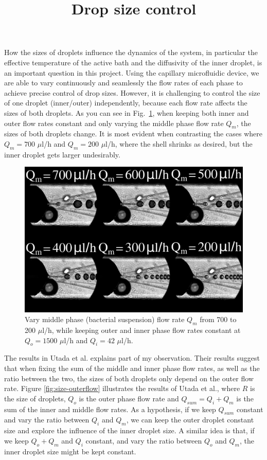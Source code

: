 \documentclass[onecolumn,aps, pre,amsmath,amssymb,longbibliography,12pt]{revtex4-2}
\begin{document}
\title{Drop size control}
\maketitle

How the sizes of droplets influence the dynamics of the system, in particular the effective temperature of the active bath and the diffusivity of the inner droplet, is an important question in this project.
Using the capillary microfluidic device, we are able to vary continuously and seamlessly the flow rates of each phase to achieve precise control of drop sizes.
However, it is challenging to control the size of one droplet (inner/outer) independently, because each flow rate affects the sizes of both droplets.
As you can see in Fig.~\ref{fig:vary-middle}, when keeping both inner and outer flow rates constant and only varying the middle phase flow rate $Q_m$, the sizes of both droplets change.
It is most evident when contrasting the cases where $Q_m=700$ $\mu$l/h and $Q_m=200$ $\mu$l/h, where the shell shrinks as desired, but the inner droplet gets larger undesirably.

\begin{figure}[h]
  \includegraphics[width=5in]{vary-middle.png}
  \caption{Vary middle phase (bacterial suspension) flow rate $Q_m$ from 700 to 200 $\mu$l/h, while keeping outer and inner phase flow rates constant at $Q_o=1500$ $\mu$l/h and $Q_i=42$ $\mu$l/h.}
  \label{fig:vary-middle}
\end{figure}

The results in Utada et al. \cite{Utada2005} explains part of my observation.
Their results suggest that when fixing the sum of the middle and inner phase flow rates, as well as the ratio between the two, the sizes of both droplets only depend on the outer flow rate.
Figure \ref{fig:size-outerflow} illustrates the results of Utada et al., where $R$ is the size of droplets, $Q_o$ is the outer phase flow rate and $Q_{sum}=Q_i+Q_m$ is the sum of the inner and middle flow rates.
As a hypothesis, if we keep $Q_{sum}$ constant and vary the ratio between $Q_i$ and $Q_m$, we can keep the outer droplet constant size and explore the influence of the inner droplet size. A similar idea is that, if we keep $Q_o+Q_m$ and $Q_i$ constant, and vary the ratio between $Q_o$ and $Q_m$, the inner droplet size might be kept constant.
\end{document}
